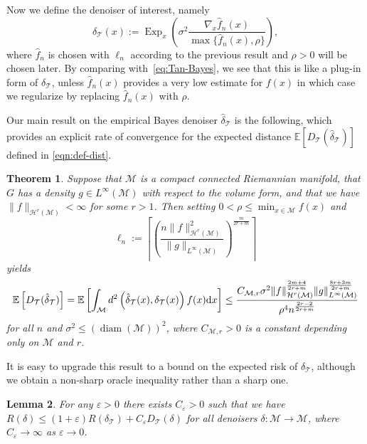 \documentclass[preprint]{imsart}
\theoremstyle{plain}
\newtheorem{theorem}{Theorem}[section]
\newtheorem{lemma}[theorem]{Lemma}
\theoremstyle{definition}
\newcommand{\Ebb}{\mathbb{E}}
\newcommand{\Mcal}{\mathcal{M}}
\newcommand{\Hcal}{\mathcal{H}}
\newcommand{\diff}{\textnormal{d}}
\newcommand{\T}{\mathcal{T}}
\DeclareMathOperator{\Exp}{Exp}
\DeclareMathOperator{\diam}{diam}
\begin{document}
Now we define the denoiser of interest, namely
\begin{equation}\label{eq:Est-Denoiser}
    \hat{\delta}_{\T}(x):= \Exp_{x}\left(\sigma^2\frac{\nabla_x \hat f_n(x)}{\max\{\hat f_n(x),\rho\}}\right),
\end{equation}
where $\hat{f}_n$ is chosen with $\ell_n$ according to the previous result and $\rho>0$ will be chosen later.
By comparing with~\eqref{eq:Tan-Bayes}, we see that this is like a plug-in form of $\delta_{\T}$, unless $\hat{f}_n(x)$ provides a very low estimate for $f(x)$ in which case we regularize by replacing $\hat{f}_n(x)$ with $\rho$.

Our main result on the empirical Bayes denoiser $\hat{\delta}_{\T}$ is the following, which provides an explicit rate of convergence for the expected distance $\Ebb[D_{\T}(\hat{\delta}_{\T})]$ defined in \eqref{eqn:def-dist}.

\begin{theorem}\label{thm:EB-risk}
    Suppose that $\Mcal$ is a compact connected Riemannian manifold, that $G$ has a density $g\in L^\infty(\Mcal)$ with respect to the volume form, and that we have $\|f\|_{\Hcal^r(\Mcal)}<\infty$ for some $r>1$.
    Then setting $0<\rho\le\min_{x\in\Mcal}f(x)$ and
    \begin{equation*}
        \ell_n := \left\lceil\left(\frac{n\|f\|^2_{\Hcal^r(\Mcal)}}{\|g\|_{L^{\infty}(\Mcal)}}\right)^{\frac{m}{2r+m}}\right\rceil
    \end{equation*}
    yields
    \begin{equation*}
        \Ebb\left[D_{\T}(\hat{\delta}_{\T})\right]=\Ebb\left[\int_{\Mcal}d^2\left(\hat{\delta}_{\T}(x),\delta_{\T}(x)\right)f(x)\diff x\right] \le\frac{C_{\Mcal,r}\sigma^{2}\|f\|_{\Hcal^r(\Mcal)}^{\frac{2m+4}{2r+m}}\|g\|_{L^{\infty}(\Mcal)}^{\frac{8r+3m}{2r+m}}}{\rho^{4}n^{\frac{2r-2}{2r+m}}}
    \end{equation*}
    for all $n$ and $\sigma^2\le (\diam(\Mcal))^2$, where $C_{\Mcal,r}>0$ is a constant depending only on $\Mcal$ and $r$.
\end{theorem}

It is easy to upgrade this result to a bound on the expected risk of $\hat{\delta}_{\T}$, although we obtain a non-sharp oracle inequality rather than a sharp one.

\begin{lemma}\label{lem:risk-to-dist}
    For any $\varepsilon>0$ there exists $C_{\varepsilon}>0$ such that we have $R(\delta) \le (1+\varepsilon)R(\delta_{\T}) + C_{\varepsilon}D_{\T}(\delta)$ for all denoisers $\delta:\Mcal\to\Mcal$, where $C_{\varepsilon}\to\infty$ as $\varepsilon\to 0$.
\end{lemma}
\end{document}
